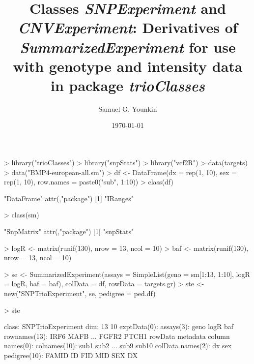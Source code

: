 \documentclass[10pt]{article}
\title{Classes \emph{SNPExperiment} and \emph{CNVExperiment}: Derivatives of \emph{SummarizedExperiment} for use with genotype and intensity data in package \emph{trioClasses}}
\author{Samuel G. Younkin}
\date{\today}
\begin{document}
\setlength{\parskip}{0.2\baselineskip}
\setlength{\parindent}{0pt}
\maketitle
\begin{Schunk}
\begin{Sinput}
> library("trioClasses")
> library("snpStats")
> library("vcf2R")
> data(targets)
> data("BMP4-european-all.sm")
> df <- DataFrame(dx = rep(1, 10), sex = rep(1, 10), row.names = paste0("sub", 
     1:10))
> class(df)
\end{Sinput}
\begin{Soutput}
[1] "DataFrame"
attr(,"package")
[1] "IRanges"
\end{Soutput}
\begin{Sinput}
> class(sm)
\end{Sinput}
\begin{Soutput}
[1] "SnpMatrix"
attr(,"package")
[1] "snpStats"
\end{Soutput}
\begin{Sinput}
> logR <- matrix(runif(130), nrow = 13, ncol = 10)
> baf <- matrix(runif(130), nrow = 13, ncol = 10)
\end{Sinput}
\end{Schunk}
\begin{Schunk}
\begin{Sinput}
> se <- SummarizedExperiment(assays = SimpleList(geno = sm[1:13, 
     1:10], logR = logR, baf = baf), colData = df, rowData = targets.gr)
> ste <- new("SNPTrioExperiment", se, pedigree = ped.df)
\end{Sinput}
\end{Schunk}
\begin{Schunk}
\begin{Sinput}
> ste
\end{Sinput}
\begin{Soutput}
class: SNPTrioExperiment 
dim: 13 10 
exptData(0):
assays(3): geno logR baf
rownames(13): IRF6 MAFB ... FGFR2 PTCH1
rowData metadata column names(0):
colnames(10): sub1 sub2 ... sub9 sub10
colData names(2): dx sex
pedigree(10): FAMID ID FID MID SEX DX
\end{Soutput}
\end{Schunk}
\end{document}
